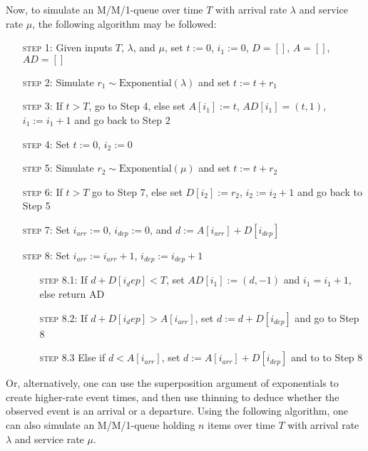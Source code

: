 \documentclass[11pt, oneside]{article}
\begin{document}
Now, to simulate an M/M/1-queue over time $T$ with arrival rate $\lambda$ and service rate $\mu$, the following algorithm may be followed:

\begin{enumerate}[leftmargin=30pt, labelindent=65pt, itemindent=30pt]
\item[\textsc{step 1:}] Given inputs $T$, $\lambda$, and $\mu$, set $t:=0$, $i_1:=0$, $D=[]$, $A=[]$, $AD=[]$
\item[\textsc{step 2:}] Simulate $r_1 \sim \text{Exponential} (\lambda)$ and set $t:=t+r_1$
\item[\textsc{step 3:}] If $t > T$, go to Step 4, else set $A[i_1]:=t$, $AD[i_1] = (t,1)$, $i_1:=i_1+1$ and go back to Step 2
\item[\textsc{step 4:}] Set $t:=0$, $i_2:=0$
\item[\textsc{step 5:}] Simulate $r_2 \sim \text{Exponential} (\mu)$ and set $t:=t+r_2$
\item[\textsc{step 6:}] If $t>T$ go to Step 7, else set $D[i_2]:=r_2$, $i_2:=i_2+1$ and go back to Step 5
\item[\textsc{step 7:}] Set $i_{arr}:=0$, $i_{dep}:=0$, and $d:=A[i_{arr}] + D[i_{dep}]$
\item[\textsc{step 8:}] Set $i_{arr}:=i_{arr}+1$, $i_{dep}:=i_{dep}+1$
\begin{enumerate}[leftmargin=25pt, labelindent=65pt, itemindent=25pt]
\item[\textsc{step 8.1:}] If $d + D[i_dep] < T$, set $AD[i_1]:= (d,-1)$ and $i_1=i_1+1$, else return AD
\item[\textsc{step 8.2:}] If $d + D[i_dep]> A[i_{arr}]$, set $d:=d+D[i_{dep}]$ and go to Step 8
\item[\textsc{step 8.3}] Else if $d< A[i_{arr}]$, set $d:=A[i_{arr}] + D[i_{dep}]$ and to to Step 8
\end{enumerate}
\end{enumerate}

Or, alternatively, one can use the superposition argument of exponentials to create higher-rate event times, and then use thinning to deduce whether the observed event is an arrival or a departure. Using the following algorithm, one can also simulate an M/M/1-queue holding $n$ items over time $T$ with arrival rate $\lambda$ and service rate $\mu$.
\end{document}
